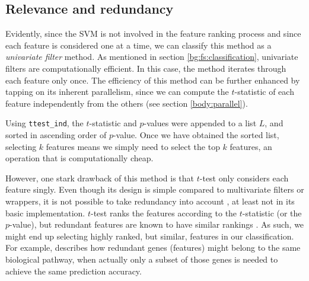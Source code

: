 \documentclass[12pt, twoside, a4paper]{report}
\begin{document}
\subsection{Relevance and redundancy} \label{t_test:redundancy}

Evidently, since the SVM is not involved in the feature ranking process and since each feature is considered one at a time, we can classify this method as a \textit{univariate filter} method. As mentioned in section \ref{bg:fs:classification}, univariate filters are computationally efficient. In this case, the method iterates through each feature only once. The efficiency of this method can be further enhanced by tapping on its inherent parallelism, since we can compute the $t$-statistic of each feature independently from the others (see section \ref{body:parallel}).

Using \texttt{ttest\_ind}, the $t$-statistic and $p$-values were appended to a list $L$, and sorted in ascending order of $p$-value. Once we have obtained the sorted list, selecting $k$ features means we simply need to select the top $k$ features, an operation that is computationally cheap.

However, one stark drawback of this method is that $t$-test only considers each feature singly. Even though its design is simple compared to multivariate filters or wrappers, it is not possible to take redundancy into account \cite{RefWorks:217}, at least not in its basic implementation. $t$-test ranks the features according to the $t$-statistic (or the $p$-value), but redundant features are known to have similar rankings \cite{RefWorks:163}. As such, we might end up selecting highly ranked, but similar, features in our classification. For example, \cite{RefWorks:220} describes how redundant genes (features) might belong to the same biological pathway, when actually only a subset of those genes is needed to achieve the same prediction accuracy.

\end{document}
